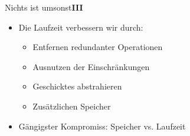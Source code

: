 \begin{frame}{Nichts ist umsonst\hfill\textbf{\color{shadeA}III}}
\begin{itemize}
    \itemsep12pt
    \item<1-> Die Laufzeit verbessern wir durch:\smallskip \begin{itemize}
        \itemsep6pt
        \item<2-> Entfernen redundanter Operationen
        \item<2-> Ausnutzen der Einschränkungen
        \item<2-> Geschicktes abstrahieren
        \item<2-> \color{black}Zusätzlichen Speicher
    \end{itemize}
    \item<4-> Gängigster Kompromiss: Speicher vs. Laufzeit
\end{itemize}
\end{frame}

